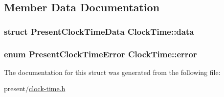\subsection{\-Member \-Data \-Documentation}
\hypertarget{structClockTime_a3fe115dffef3ba153e1fff6e0b2c0a23}{
\subsubsection[{data\-\_\-}]{\setlength{\rightskip}{0pt plus 5cm}struct \-Present\-Clock\-Time\-Data {\bf \-Clock\-Time\-::data\-\_\-}}}\label{structClockTime_a3fe115dffef3ba153e1fff6e0b2c0a23}
\hypertarget{structClockTime_a58f5305f36468eee0d1c489b5d72d717}{
\subsubsection[{error}]{\setlength{\rightskip}{0pt plus 5cm}enum {\bf \-Present\-Clock\-Time\-Error} {\bf \-Clock\-Time\-::error}}}\label{structClockTime_a58f5305f36468eee0d1c489b5d72d717}


\-The documentation for this struct was generated from the following file\-:\begin{DoxyCompactItemize}
\item 
present/\hyperlink{clock-time_8h}{clock-\/time.\-h}\end{DoxyCompactItemize}
